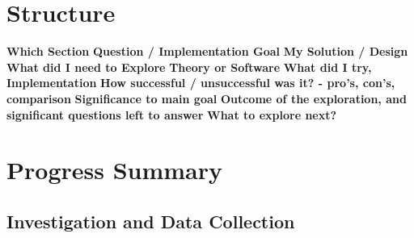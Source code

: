 \documentclass[a4paper,11pt,titlepage]{article}
\begin{document}
\section{Structure}
	\textbf{Which Section}
	\textbf{Question / Implementation Goal}
	\textbf{My Solution / Design}
	\textbf{What did I need to Explore}
	\textbf{Theory or Software}
	\textbf{What did I try, Implementation}
	\textbf{How successful / unsuccessful was it? - pro's, con's, comparison}
	\textbf{Significance to main goal}
	\textbf{Outcome of the exploration, and significant questions left to answer}
	\textbf{What to explore next?}

































\section{Progress Summary}
	\subsection{Investigation and Data Collection}
\end{document}
